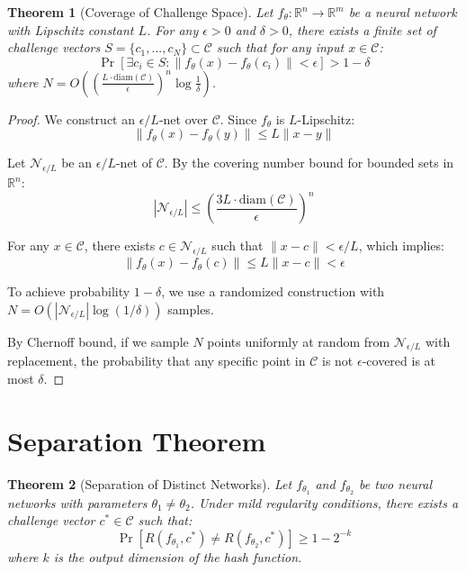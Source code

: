 \documentclass[11pt]{article}
\theoremstyle{plain}
\newtheorem{theorem}{Theorem}
\theoremstyle{definition}
\theoremstyle{remark}
\begin{document}
\begin{theorem}[Coverage of Challenge Space]
\label{thm:coverage}
Let $f_\theta: \mathbb{R}^n \rightarrow \mathbb{R}^m$ be a neural network with 
Lipschitz constant $L$. For any $\epsilon > 0$ and $\delta > 0$, there exists 
a finite set of challenge vectors $S = \{c_1, ..., c_N\} \subset \mathcal{C}$ 
such that for any input $x \in \mathcal{C}$:
$$\Pr[\exists c_i \in S: \|f_\theta(x) - f_\theta(c_i)\| < \epsilon] > 1 - \delta$$
where $N = O\left(\left(\frac{L\cdot\text{diam}(\mathcal{C})}{\epsilon}\right)^n 
\log\frac{1}{\delta}\right)$.
\end{theorem}

\begin{proof}
We construct an $\epsilon/L$-net over $\mathcal{C}$. Since $f_\theta$ is 
$L$-Lipschitz:
$$\|f_\theta(x) - f_\theta(y)\| \leq L\|x - y\|$$

Let $\mathcal{N}_{\epsilon/L}$ be an $\epsilon/L$-net of $\mathcal{C}$. 
By the covering number bound for bounded sets in $\mathbb{R}^n$:
$$|\mathcal{N}_{\epsilon/L}| \leq \left(\frac{3L\cdot\text{diam}(\mathcal{C})}
{\epsilon}\right)^n$$

For any $x \in \mathcal{C}$, there exists $c \in \mathcal{N}_{\epsilon/L}$ 
such that $\|x - c\| < \epsilon/L$, which implies:
$$\|f_\theta(x) - f_\theta(c)\| \leq L\|x - c\| < \epsilon$$

To achieve probability $1-\delta$, we use a randomized construction with 
$N = O(|\mathcal{N}_{\epsilon/L}| \log(1/\delta))$ samples.

By Chernoff bound, if we sample $N$ points uniformly at random from 
$\mathcal{N}_{\epsilon/L}$ with replacement, the probability that any 
specific point in $\mathcal{C}$ is not $\epsilon$-covered is at most $\delta$.
\end{proof}

\section{Separation Theorem}

\begin{theorem}[Separation of Distinct Networks]
\label{thm:separation}
Let $f_{\theta_1}$ and $f_{\theta_2}$ be two neural networks with parameters 
$\theta_1 \neq \theta_2$. Under mild regularity conditions, there exists a 
challenge vector $c^* \in \mathcal{C}$ such that:
$$\Pr[R(f_{\theta_1}, c^*) \neq R(f_{\theta_2}, c^*)] \geq 1 - 2^{-k}$$
where $k$ is the output dimension of the hash function.
\end{theorem}
\end{document}
